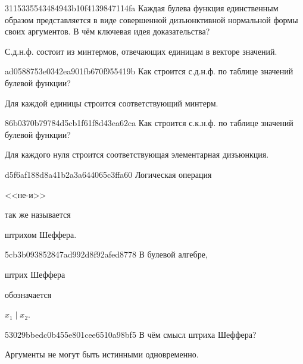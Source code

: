 \begin{note}{3115335543484943b10f4139847114fa}
    Каждая булева функция единственным образом представляется в виде совершенной дизъюнктивной нормальной формы своих аргументов.
    В чём ключевая идея доказательства?

    \begin{cloze}{1}
        С.д.н.ф. состоит из минтермов, отвечающих единицам в векторе значений.
    \end{cloze}
\end{note}

\begin{note}{ad0588753e0342ea901fb670f955419b}
    Как строится с.д.н.ф. по таблице значений булевой функции?

    \begin{cloze}{1}
        Для каждой единицы строится соответствующий минтерм.
   \end{cloze}
\end{note}

\begin{note}{86b0370b79784d5cb1f61f8d43ea62ca}
    Как строится с.к.н.ф. по таблице значений булевой функции?

    \begin{cloze}{1}
        Для каждого нуля строится соответствующая элементарная дизъюнкция.
   \end{cloze}
\end{note}

\begin{note}{d5f6af188d8a41b2a3a644065c3ffa60}
    Логическая операция \begin{icloze}{2}<<не-и>>\end{icloze} так же называется \begin{icloze}{1}штрихом Шеффера.\end{icloze}
\end{note}

\begin{note}{5cb3b093852847ad992d8f92afed8778}
    В булевой алгебре, \begin{icloze}{2}штрих Шеффера\end{icloze} обозначается \begin{icloze}{1}\({ x_1 \mid x_2 }\).\end{icloze}
\end{note}

\begin{note}{53029bbedc0b455e801cee6510a98bf5}
    В чём смысл штриха Шеффера?

    \begin{cloze}{1}
        Аргументы не могут быть истинными одновременно.
    \end{cloze}
\end{note}

